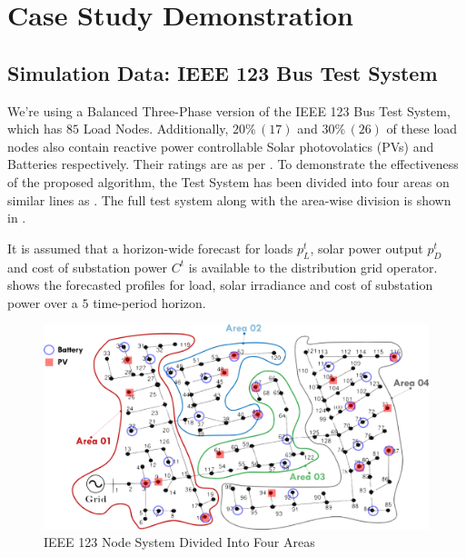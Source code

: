 \documentclass[../../outputs/main.tex]{subfiles}
\begin{document}
\section{Case Study Demonstration}

\subsection{Simulation Data: IEEE 123 Bus Test System}

We're using a Balanced Three-Phase version of the IEEE 123 Bus Test System, which has $85$ Load Nodes. Additionally, $20 \% \, (17)$ and $30 \% \, (26)$ of these load nodes also contain reactive power controllable Solar photovolatics (PVs) and Batteries respectively. Their ratings are as per . To demonstrate the effectiveness of the proposed algorithm, the Test System has been divided into four areas on similar lines as \cite{Sadnan}. The full test system along with the area-wise division is shown in .

It is assumed that a horizon-wide forecast for loads $p^t_L$, solar power output $p^t_D$ and cost of substation power  $C^t$ is available to the distribution grid operator.  shows the forecasted profiles for load, solar irradiance and cost of substation power over a $5$ time-period horizon. 

\begin{figure}[h!]
    \centering
    \includegraphics[width=\linewidth]{../figures/ieee123-FourAreas-pv20-batt30.png}
    \caption{IEEE 123 Node System Divided Into Four Areas}
    \label{fig:ieee123-four-area-figure}
\end{figure}
\end{document}
